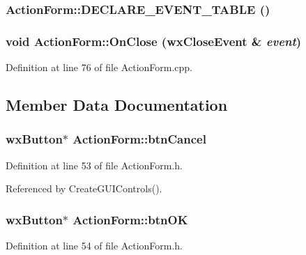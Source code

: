 \subsubsection{\setlength{\rightskip}{0pt plus 5cm}Action\-Form::DECLARE\_\-EVENT\_\-TABLE ()\hspace{0.3cm}{\tt  [private]}}\label{class_action_form_4a50ffe8d867419599210d83571be527}


\subsubsection{\setlength{\rightskip}{0pt plus 5cm}void Action\-Form::On\-Close (wx\-Close\-Event \& {\em event})\hspace{0.3cm}{\tt  [private]}}\label{class_action_form_a315784381caac46ad81800c4703ac02}




Definition at line 76 of file Action\-Form.cpp.

\subsection{Member Data Documentation}
\subsubsection{\setlength{\rightskip}{0pt plus 5cm}wx\-Button$\ast$ {\bf Action\-Form::btn\-Cancel}\hspace{0.3cm}{\tt  [private]}}\label{class_action_form_c8154edb5a26ea580e0d475f2ae06822}




Definition at line 53 of file Action\-Form.h.

Referenced by Create\-GUIControls().
\subsubsection{\setlength{\rightskip}{0pt plus 5cm}wx\-Button$\ast$ {\bf Action\-Form::btn\-OK}\hspace{0.3cm}{\tt  [private]}}\label{class_action_form_0c838f56a06178140d2ab77de72048e3}




Definition at line 54 of file Action\-Form.h.

